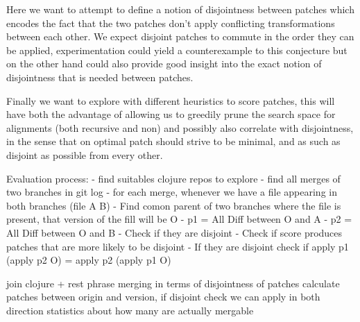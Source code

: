 \documentclass[11pt]{article}
\begin{document}
Here we want to attempt to define a notion of disjointness between patches which 
encodes the fact that the two patches don't apply conflicting transformations 
between each other. We expect disjoint patches to commute in the order they can 
be applied, experimentation could yield a counterexample to this conjecture but 
on the other hand could also provide good insight into the exact notion of 
disjointness that is needed between patches.

Finally we want to explore with different heuristics to score patches, this will 
have both the advantage of allowing us to greedily prune the search space for 
alignments (both recursive and non) and possibly also correlate with 
disjointness, in the sense that on optimal patch should strive to be minimal, 
and as such as disjoint as possible from every other.

Evaluation process:
  - find suitables clojure repos to explore
  - find all merges of two branches in git log
  - for each merge, whenever we have a file appearing in both branches (file A B)
  - Find comon parent of two branches where the file is present, that version of the fill will be O
  - p1 = All Diff between O and A
  - p2 = All Diff between O and B 
  - Check if they are disjoint
      - Check if score produces patches that are more likely to be disjoint
  - If they are disjoint check if apply p1 (apply p2 O) = apply p2 (apply p1 O)
  

join clojure + rest phrase merging in terms of disjointness of patches
calculate patches between origin and version, if disjoint check we can
apply in both direction statistics about how many are actually mergable
\end{document}
